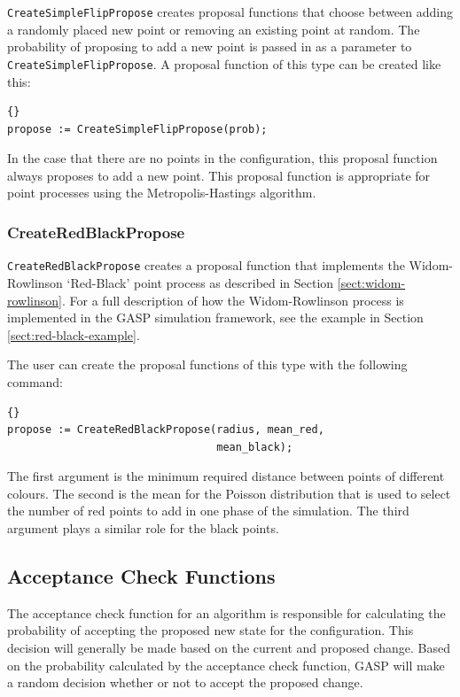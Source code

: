 \texttt{CreateSimpleFlipPropose} creates proposal functions that
choose between adding a randomly placed new point or removing an
existing point at random.  The probability of proposing to add a new
point is passed in as a parameter to \texttt{CreateSimpleFlipPropose}.
A proposal function of this type can be created like this:
\begin{lstlisting}{}
propose := CreateSimpleFlipPropose(prob);
\end{lstlisting}

\noindent In the case that there are no points in the configuration,
this proposal function always proposes to add a new point.  This
proposal function is appropriate for point processes using the
Metropolis-Hastings algorithm.

\subsubsection{CreateRedBlackPropose}

\texttt{CreateRedBlackPropose} creates a proposal function that
implements the Widom-Rowlinson `Red-Black' point process as described
in Section \ref{sect:widom-rowlinson}.  For a full
description of how the Widom-Rowlinson process is implemented in the
GASP simulation framework, see the example in Section
\ref{sect:red-black-example}.

The user can create the proposal functions of this type with the following
command:
\begin{lstlisting}{}
propose := CreateRedBlackPropose(radius, mean_red,
                                 mean_black);
\end{lstlisting}

\noindent The first argument is the minimum required distance between
points of different colours.  The second is the mean for the Poisson
distribution that is used to select the number of red points to add in
one phase of the simulation.  The third argument plays a similar role
for the black points.

\subsection{Acceptance Check Functions}

The acceptance check function for an algorithm is responsible for
calculating the probability of accepting the proposed new state for
the configuration.  This decision will generally be made based on the
current and proposed change.  Based on the probability calculated by
the acceptance check function, GASP will make a random decision
whether or not to accept the proposed change.

